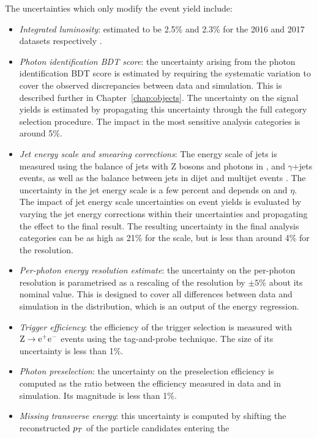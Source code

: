 The uncertainties which only modify the event yield include:
\begin{itemize}
\item \textit{Integrated luminosity}: 
  estimated to be 2.5\% and 2.3\% for the 2016 and 2017 datasets respectively \cite{Lumi2016,Lumi2017}.
\item \textit{Photon identification BDT score}: 
  the uncertainty arising from the photon identification BDT score 
  is estimated by requiring the systematic variation 
  to cover the observed discrepancies between data and simulation. 
  This is described further in Chapter~\ref{chap:objects}.
  The uncertainty on the signal yields is
  estimated by propagating this uncertainty through the full category selection procedure.
  The impact in the most sensitive analysis categories is around 5\%.
\item \textit{Jet energy scale and smearing corrections}: 
  The energy scale of jets is measured using the \pt balance of jets with Z bosons and photons in
  \Zee, \Zmumu and $\gamma$+jets events, as well as the \pt balance between jets 
  in dijet and multijet events \cite{JetsInRun2}. The uncertainty in the jet energy scale
  is a few percent and depends on \pt and $\eta$. The impact of jet energy scale uncertainties on 
  event yields is evaluated by varying the jet energy corrections within their uncertainties and 
  propagating the effect to the final result.
  The resulting uncertainty in the final analysis categories can be as high as 21\% 
  for the scale, but is less than around 4\% for the resolution.
\item \textit{Per-photon energy resolution estimate}: 
  the uncertainty on the per-photon resolution is
  parametrised as a rescaling of the resolution by
  $\pm 5\%$ about its nominal value. 
  This is designed to cover all differences between data and simulation 
  in the distribution, which is an output of the energy regression.
\item \textit{Trigger efficiency}: 
  the efficiency of the trigger selection is measured with 
  $\mathrm{Z}\rightarrow{\mathrm{e}^{+}\mathrm{e}^{-}}$ events using the tag-and-probe technique.
  The size of its uncertainty is less than 1\%.
\item \textit{Photon preselection}: 
  the uncertainty on the preselection efficiency
  is computed as the ratio between the efficiency measured in data and in simulation.
  Its magnitude is less than 1\%.
\item \textit{Missing transverse energy}: 
  this uncertainty is computed by shifting the
  reconstructed $p_T$ of the particle candidates entering the

\end{itemize}
